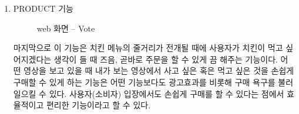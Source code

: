 \documentclass{oblivoir}
\begin{document}
\begin{enumerate}
\begin{enumerate}
        \item PRODUCT 기능
        
        \begin{figure}[h!]
            \centering
            \caption{web 화면 – Vote}
        \end{figure} 

    마지막으로 이 기능은 치킨 메뉴의 줄거리가 전개될 때에 사용자가 치킨이 먹고 싶어지겠다는 생각이 들 때 즈음, 곧바로 주문을 할 수 있게 끔 해주는 기능이다. 어떤 영상을 보고 있을 때 내가 보는 영상에서 사고 싶은 혹은 먹고 싶은 것을 손쉽게 구매할 수 있게 하는 기능은 어떤 기능보다도 광고효과를 비롯해 구매 욕구를 불러일으킬 수 있다. 사용자(소비자) 입장에서도 손쉽게 구매를 할 수 있다는 점에서 효율적이고 편리한 기능이라고 할 수 있다.
    \end{enumerate}
\end{enumerate}
\end{document}
